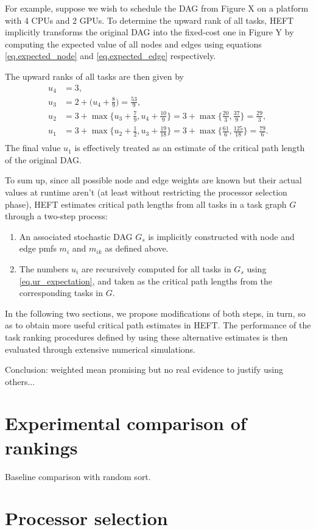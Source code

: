 \documentclass[12pt]{article}
\begin{document}
For example, suppose we wish to schedule the DAG from Figure X on a platform with 4 CPUs and 2 GPUs. To determine the upward rank of all tasks, HEFT implicitly transforms the original DAG into the fixed-cost one in Figure Y by computing the expected value of all nodes and edges using equations \eqref{eq.expected_node} and \eqref{eq.expected_edge} respectively.

The upward ranks of all tasks are then given by 
\begin{align*}
u_4 &= 3, \\
u_3 &= 2 + \bigg(u_4 + \frac{8}{9}\bigg) = \frac{53}{9}, \\
u_2 &= 3 + \max \bigg \{ u_3 + \frac{7}{9}, u_4 + \frac{10}{9} \bigg \} = 3 + \max \bigg \{ \frac{20}{3}, \frac{37}{9} \bigg \} = \frac{29}{3}, \\
u_1 &= 3 + \max \bigg \{ u_2 + \frac{1}{2}, u_3 + \frac{19}{18} \bigg \} = 3 + \max \bigg \{ \frac{61}{6}, \frac{125}{18} \bigg \} = \frac{79}{6}. \\
\end{align*} 
The final value $u_1$ is effectively treated as an estimate of the critical path length of the original DAG. 

To sum up, since all possible node and edge weights are known but their actual values at runtime aren't (at least without restricting the processor selection phase), HEFT estimates critical path lengths from all tasks in a task graph $G$ through a two-step process:
\begin{enumerate}
	\item An associated stochastic DAG $G_s$ is implicitly constructed with node and edge pmfs $m_i$ and $m_{ik}$ as defined above.   
	\item The numbers $u_i$ are recursively computed for all tasks in $G_s$ using \eqref{eq.ur_expectation}, and taken as the critical path lengths from the corresponding tasks in $G$.      
\end{enumerate}
In the following two sections, we propose modifications of both steps, in turn, so as to obtain more useful critical path estimates in HEFT. The performance of the task ranking procedures defined by using these alternative estimates is then evaluated through extensive numerical simulations.

Conclusion: weighted mean promising but no real evidence to justify using others... 

\section{Experimental comparison of rankings}
\label{sect.experimental_rankings}

Baseline comparison with random sort.

\section{Processor selection}
\label{sect.processor_selection}




\end{document}
